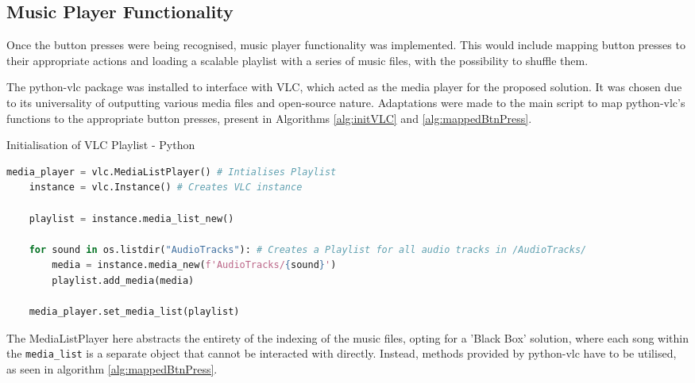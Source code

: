 \subsection{Music Player Functionality}\label{subsec:playlist}
Once the button presses were being recognised, music player functionality was implemented. This would include mapping button presses to their appropriate actions and loading a scalable playlist with a series of music files, with the possibility to shuffle them.

The python-vlc package was installed to interface with VLC, which acted as the media player for the proposed solution. It was chosen due to its universality of outputting various media files and open-source nature. Adaptations were made to the main script to map python-vlc's functions to the appropriate button presses, present in Algorithms \ref{alg:initVLC} and \ref{alg:mappedBtnPress}.

\begin{algorithm}[H]
  \caption{Initialisation of VLC Playlist - Python}
  \label{alg:initVLC}
  \begin{lstlisting}[language=Python]
    media_player = vlc.MediaListPlayer() # Intialises Playlist
    instance = vlc.Instance() # Creates VLC instance

    playlist = instance.media_list_new()

    for sound in os.listdir("AudioTracks"): # Creates a Playlist for all audio tracks in /AudioTracks/
        media = instance.media_new(f'AudioTracks/{sound}')
        playlist.add_media(media)

    media_player.set_media_list(playlist)
  \end{lstlisting}
\end{algorithm}
The MediaListPlayer here abstracts the entirety of the indexing of the music files, opting for a 'Black Box' solution, where each song within the \texttt{media\_list} is a separate object that cannot be interacted with directly. Instead, methods provided by python-vlc have to be utilised, as seen in algorithm \ref{alg:mappedBtnPress}.

